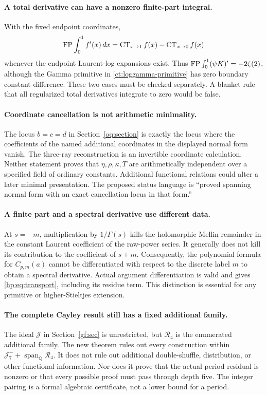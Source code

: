 \paragraph{A total derivative can have a nonzero finite-part integral.}
With the fixed endpoint coordinates,
\[
 \operatorname{FP}\int_0^1 f'(x)\,dx=\operatorname{CT}_{x\to1}f(x)-\operatorname{CT}_{x\to0}f(x)
\]
whenever the endpoint Laurent-log expansions exist. Thus
$\operatorname{FP}\int_0^1(\psi K)'=-2\zeta(2)$, although the Gamma primitive
in \eqref{ct:loggamma-primitive} has zero boundary constant difference.
These two cases must be checked separately. A blanket rule that all
regularized total derivatives integrate to zero would be false.

\paragraph{Coordinate cancellation is not arithmetic minimality.}
The locus $b=c=d$ in Section~\ref{oq:section} is exactly the locus
where the coefficients of the named additional coordinates in the
displayed normal form vanish. The three-ray reconstruction is an
invertible coordinate calculation. Neither statement proves that
$\eta,\rho,\kappa,T$ are arithmetically independent over a specified
field of ordinary constants. Additional functional relations could
alter a later minimal presentation. The proposed status language is
``proved spanning normal form with an exact cancellation locus in that
form.''

\paragraph{A finite part and a spectral derivative use different data.}
At $s=-m$, multiplication by $1/\Gamma(s)$ kills the holomorphic
Mellin remainder in the constant Laurent coefficient of the raw-power
series. It generally does not kill its contribution to the coefficient
of $s+m$. Consequently, the polynomial formula for $C_{p,m}(a)$
cannot be differentiated with respect to the discrete label $m$ to
obtain a spectral derivative. Actual argument differentiation is valid
and gives \eqref{hp:eq:transport}, including its residue term. This
distinction is essential for any primitive or higher-Stieltjes
extension.

\paragraph{The complete Cayley result still has a fixed additional family.}
The ideal $\mathcal J$ in Section~\ref{gf:sec} is unrestricted, but
$\mathscr R_4$ is the enumerated additional family. The new theorem
rules out every construction within
$\mathcal J_7^-+\operatorname{span}_{\mathbb Q}\mathscr R_4$.
It does not rule out additional double-shuffle, distribution, or other
functional information. Nor does it prove that the actual period
residual is nonzero or that every possible proof must pass through
depth five. The integer pairing is a formal algebraic certificate,
not a lower bound for a period.

